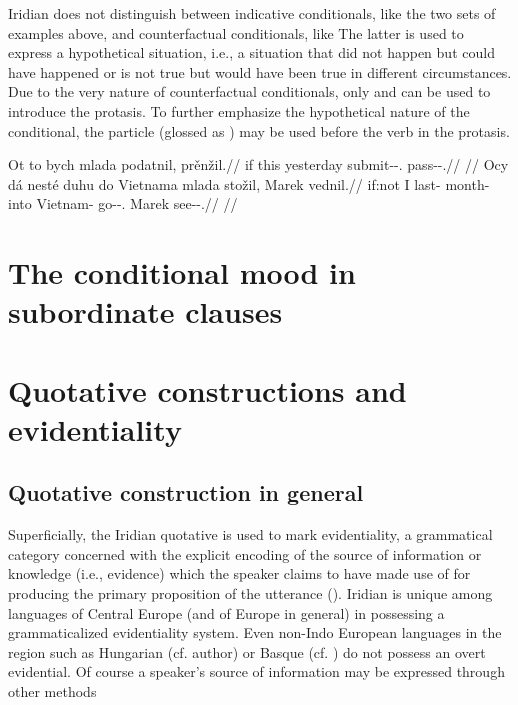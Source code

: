 Iridian does not distinguish between indicative conditionals, like the two sets
of examples above, and counterfactual conditionals, like  The latter is used to express a hypothetical situation, i.e.,
a situation that did not happen but could have happened or is not true but would
have been true in different circumstances. Due to the very nature of
counterfactual conditionals, only  and  can be used to
introduce the protasis. To further emphasize the hypothetical nature of the
conditional, the particle  (glossed as \Hyp{}) may be used before the
verb in the protasis.

\pex
	\a
	\begingl
		\gla Ot to bych mlada podatnil, prěnžil.//
		\glb if this yesterday \Hyp{} submit-\Pv{}-\Cond{}.\Pf{} pass-\Av{}-\Cond{}.\Pf{}//
		\glft {}//
	\endgl
	\a
	\begingl
		\gla Ocy dá nesté duhu do Vietnama mlada stožil, Marek vednil.//
		\glb if:not I last-\Att{} month-\Ins{} into Vietnam-\Acc{} \Hyp{} go-\Av{}-\Cond{}.\Pf{} Marek see-\Pv{}-\Cond{}.\Pf{}//
		\glft {}//
	\endgl
\xe


\section{The conditional mood in subordinate clauses}
\label{sec:conditional-subordinate}

\section{Quotative constructions and  evidentiality}\label{sec:reportedspeech}

\subsection{Quotative construction in general}

Superficially, the Iridian quotative is used to mark {\sc evidentiality}, a
grammatical category concerned with the explicit encoding of the source of
information or knowledge (i.e., evidence) which the speaker claims to have made
use of for producing the primary proposition of the utterance
(\cite[1-2]{diewald2010}). Iridian is unique among languages of Central Europe
(and of Europe in general) in possessing a grammaticalized evidentiality system.
Even non-Indo European languages in the region such as Hungarian (cf. author) or
Basque (cf. \cite{alcazar2010}) do not possess an overt evidential. Of course a
speaker’s source of information may be expressed through other methods 

